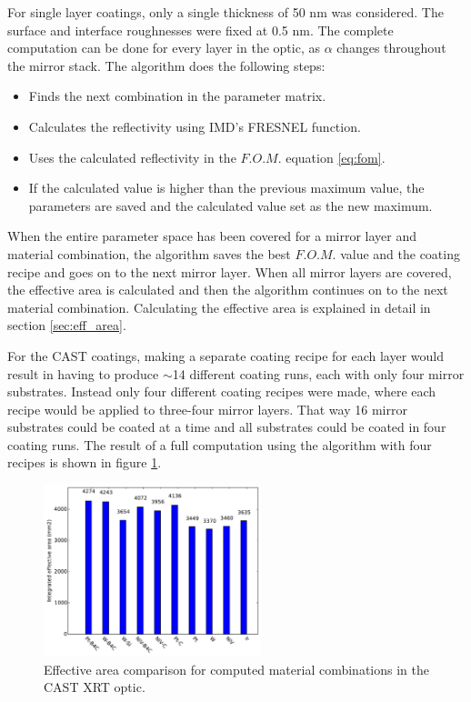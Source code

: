 For single layer coatings, only a single thickness of 50 nm was considered. The surface and interface roughnesses were fixed at 0.5 nm. The complete computation can be done for every layer in the optic, as $\alpha$ changes throughout the mirror stack. The algorithm does the following steps:
\begin{itemize}
  \item[\bf 1] Finds the next combination in the parameter matrix.
  \item[\bf 2] Calculates the reflectivity using IMD's FRESNEL function.
  \item[\bf 3] Uses the calculated reflectivity in the $F.O.M.$ equation \ref{eq:fom}.
  \item[\bf 4] If the calculated value is higher than the previous maximum value, the parameters are saved and the calculated value set as the new maximum.
\end{itemize}

When the entire parameter space has been covered for a mirror layer and material combination, the algorithm saves the best $F.O.M.$ value and the coating recipe and goes on to the next mirror layer. When all mirror layers are covered, the effective area is calculated and then the algorithm continues on to the next material combination. Calculating the effective area is explained in detail in section \ref{sec:eff_area}.

For the CAST coatings, making a separate coating recipe for each layer would result in having to produce $\sim$14 different coating runs, each with only four mirror substrates. Instead only four different coating recipes were made, where each recipe would be applied to three-four mirror layers. That way 16 mirror substrates could be coated at a time and all substrates could be coated in four coating runs. The result of a full computation using the algorithm with four recipes is shown in figure \ref{fig:mat_result}.

\begin{figure}[htbp]
  \centering
    \includegraphics[height=5cm]{figures/cast/mat_result.pdf}
  \caption{\footnotesize Effective area comparison for computed material combinations in the CAST XRT optic.}
  \label{fig:mat_result}
\end{figure}


